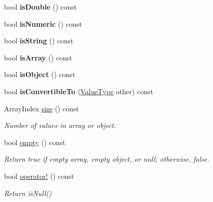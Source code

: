 \begin{DoxyCompactItemize}
bool {\bfseries is\+Double} () const
\item 
\mbox{\label{class_json_1_1_value_af961a000cd203c895e44c195ab39b866}} 
bool {\bfseries is\+Numeric} () const
\item 
\mbox{\label{class_json_1_1_value_a71e1f82cf1c3eaf969d400dcffb163a6}} 
bool {\bfseries is\+String} () const
\item 
\mbox{\label{class_json_1_1_value_a1627eb9d6568d6d0252fa8bb711c0a59}} 
bool {\bfseries is\+Array} () const
\item 
\mbox{\label{class_json_1_1_value_a8cf96c0f2a552051fcfc78ffee60e037}} 
bool {\bfseries is\+Object} () const
\item 
\mbox{\label{class_json_1_1_value_af1ee6be27a96a7d12128efdd60deb54d}} 
bool {\bfseries is\+Convertible\+To} (\mbox{\hyperlink{namespace_json_a7d654b75c16a57007925868e38212b4e}{Value\+Type}} other) const
\item 
\mbox{\label{class_json_1_1_value_a0ec2808e1d7efa4e9fad938d6667be44}} 
Array\+Index \mbox{\hyperlink{class_json_1_1_value_a0ec2808e1d7efa4e9fad938d6667be44}{size}} () const
\begin{DoxyCompactList}\small\item\em Number of values in array or object. \end{DoxyCompactList}\item 
\mbox{\label{class_json_1_1_value_a0519a551e37ee6665d74742b3f96bab3}} 
bool \mbox{\hyperlink{class_json_1_1_value_a0519a551e37ee6665d74742b3f96bab3}{empty}} () const
\begin{DoxyCompactList}\small\item\em Return true if empty array, empty object, or null; otherwise, false. \end{DoxyCompactList}\item 
\mbox{\label{class_json_1_1_value_a731b89fb4764c39ce2328e1707c822b9}} 
bool \mbox{\hyperlink{class_json_1_1_value_a731b89fb4764c39ce2328e1707c822b9}{operator!}} () const
\begin{DoxyCompactList}\small\item\em Return is\+Null() \end{DoxyCompactList}\item 

\end{DoxyCompactItemize}

